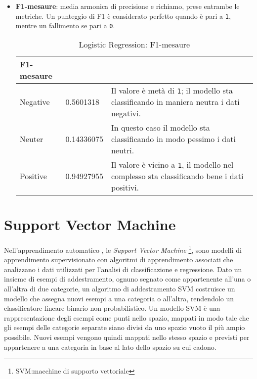 \begin{itemize}
				\item \textbf{F1-mesaure}: media armonica di precisione e richiamo, prese entrambe le metriche. Un punteggio di F1 è considerato perfetto quando è pari a \verb|1|, mentre un fallimento se pari a \verb|0|. 
				\begin{table} [H]
					\caption{Logistic Regression: F1-mesaure} 
					\label{tab:F1-mesaureLogisticRegression}
					\centering
					\begin{tabular}{llp{}}
						\toprule 
						\textbf{F1-mesaure}	\\
						\midrule
						Negative  & 0.5601318  & Il valore è metà di \verb|1|; il modello sta classificando in maniera neutra i dati negativi.\\
						Neuter & 0.14336075 & In questo caso il modello sta classificando in modo pessimo i dati neutri.\\
						Positive & 0.94927955 & Il valore è vicino a \verb|1|, il modello nel complesso sta classificando bene i dati positivi.\\
						\bottomrule
					\end{tabular}
				\end{table} 
				
			\end{itemize}
			

		\section{Support Vector Machine}
			Nell'apprendimento automatico , le \textit{Support Vector Machine} \footnote{SVM:macchine di supporto vettoriale}, sono modelli di apprendimento supervisionato con algoritmi di apprendimento associati che analizzano i dati utilizzati per l'analisi di classificazione e regressione. Dato un insieme di esempi di addestramento, ognuno segnato come appartenente all'una o all'altra di due categorie, un algoritmo di addestramento SVM costruisce un modello che assegna nuovi esempi a una categoria o all'altra, rendendolo un classificatore lineare binario non probabilistico. Un modello SVM è una rappresentazione degli esempi come punti nello spazio, mappati in modo tale che gli esempi delle categorie separate siano divisi da uno spazio vuoto il più ampio possibile. Nuovi esempi vengono quindi mappati nello stesso spazio e previsti per appartenere a una categoria in base al lato dello spazio su cui cadono.
			
